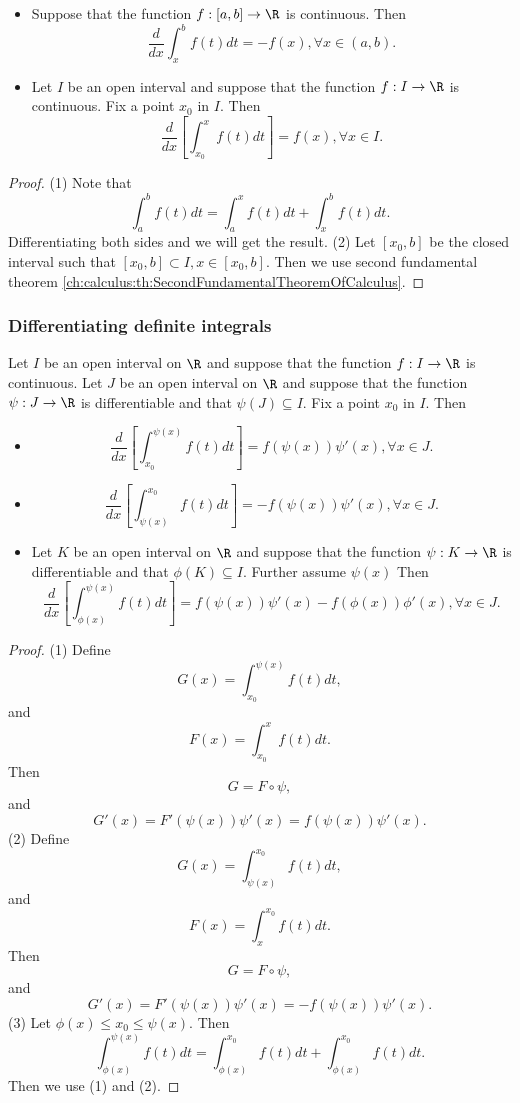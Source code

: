 \begin{refsection}
\begin{lemma}\cite[170]{fitzpatrick2006advanced}\hfill
\begin{itemize}
	\item Suppose that the function $f:[a,b]\to \R$ is continuous. Then
	$$\frac{d}{dx}\int_x^b f(t)dt = -f(x), \forall x\in (a,b).$$
	\item Let $I$ be an open interval and suppose that the function $f:I\to \R$ is continuous. Fix a point $x_0$ in $I$. Then
	$$\frac{d}{dx}[\int_{x_0}^{x} f(t)dt] = f(x), \forall x\in I.$$
\end{itemize}	
\end{lemma}
\begin{proof}
(1) Note that
$$\int_a^b f(t)dt = \int_a^x f(t)dt + \int_x^b f(t)dt.$$
Differentiating both sides and we will get the result.
(2)	Let $[x_0,b]$ be the closed interval such that
$[x_0,b] \subset I, x\in [x_0,b]$. Then we use second fundamental theorem \autoref{ch:calculus:th:SecondFundamentalTheoremOfCalculus}.
\end{proof}
\subsubsection{Differentiating definite integrals}
\begin{lemma}\cite[171]{fitzpatrick2006advanced}
Let $I$ be an open interval on $\R$ and suppose that the function $f:I\to \R$	is continuous. Let $J$ be an open interval on $\R$ and suppose that the function $\psi:J\to \R$	is differentiable and that $\psi(J)\subseteq I$. Fix a point $x_0$ in $I$. Then	
\begin{itemize}
	\item 
	$$\frac{d}{dx}[\int_{x_0}^{\psi(x)} f(t)dt] = f(\psi(x))\psi'(x), \forall x\in J.$$ 
	\item
	$$\frac{d}{dx}[\int^{x_0}_{\psi(x)} f(t)dt] = -f(\psi(x))\psi'(x), \forall x\in J.$$ 
	\item  Let $K$ be an open interval on $\R$ and suppose that the function $\psi:K\to \R$	is differentiable and that $\phi(K)\subseteq I$. Further assume $\psi(x)$ Then
		$$\frac{d}{dx}[\int_{\phi(x)}^{\psi(x)} f(t)dt] = f(\psi(x))\psi'(x)-f(\phi(x))\phi'(x), \forall x\in J.$$ 
\end{itemize}	
\end{lemma}
\begin{proof}
(1)	
Define 
$$G(x) = \int_{x_0}^{\psi(x)} f(t)dt,$$
and
$$F(x) = \int_{x_0}^{x} f(t)dt.$$
Then
$$G = F\circ \psi,$$
and
$$G'(x) = F'(\psi(x))\psi'(x) = f(\psi(x))\psi'(x).$$
(2)
Define 
$$G(x) = \int^{x_0}_{\psi(x)} f(t)dt,$$
and
$$F(x) = \int^{x_0}_{x} f(t)dt.$$
Then
$$G = F\circ \psi,$$
and
$$G'(x) = F'(\psi(x))\psi'(x) = -f(\psi(x))\psi'(x).$$
(3)
Let $\phi(x) \leq x_0 \leq \psi(x)$. Then
	$$\int_{\phi(x)}^{\psi(x)} f(t)dt = \int_{\phi(x)}^{x_0} f(t)dt+\int_{\phi(x)}^{x_0} f(t)dt.$$
Then we use (1) and (2).	
\end{proof}


\end{refsection}

